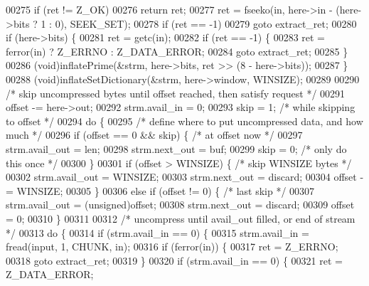 \begin{DoxyCode}
00275     \textcolor{keywordflow}{if} (ret != Z\_OK)
00276         \textcolor{keywordflow}{return} ret;
00277     ret = fseeko(in, here->in - (here->bits ? 1 : 0), SEEK\_SET);
00278     \textcolor{keywordflow}{if} (ret == -1)
00279         \textcolor{keywordflow}{goto} extract\_ret;
00280     \textcolor{keywordflow}{if} (here->bits) \{
00281         ret = getc(in);
00282         \textcolor{keywordflow}{if} (ret == -1) \{
00283             ret = ferror(in) ? Z\_ERRNO : Z\_DATA\_ERROR;
00284             \textcolor{keywordflow}{goto} extract\_ret;
00285         \}
00286         (void)inflatePrime(&strm, here->bits, ret >> (8 - here->bits));
00287     \}
00288     (void)inflateSetDictionary(&strm, here->window, WINSIZE);
00289 
00290     \textcolor{comment}{/* skip uncompressed bytes until offset reached, then satisfy request */}
00291     offset -= here->out;
00292     strm.avail\_in = 0;
00293     skip = 1;                               \textcolor{comment}{/* while skipping to offset */}
00294     \textcolor{keywordflow}{do} \{
00295         \textcolor{comment}{/* define where to put uncompressed data, and how much */}
00296         \textcolor{keywordflow}{if} (offset == 0 && skip) \{          \textcolor{comment}{/* at offset now */}
00297             strm.avail\_out = len;
00298             strm.next\_out = buf;
00299             skip = 0;                       \textcolor{comment}{/* only do this once */}
00300         \}
00301         \textcolor{keywordflow}{if} (offset > WINSIZE) \{             \textcolor{comment}{/* skip WINSIZE bytes */}
00302             strm.avail\_out = WINSIZE;
00303             strm.next\_out = discard;
00304             offset -= WINSIZE;
00305         \}
00306         \textcolor{keywordflow}{else} \textcolor{keywordflow}{if} (offset != 0) \{             \textcolor{comment}{/* last skip */}
00307             strm.avail\_out = (unsigned)offset;
00308             strm.next\_out = discard;
00309             offset = 0;
00310         \}
00311 
00312         \textcolor{comment}{/* uncompress until avail\_out filled, or end of stream */}
00313         \textcolor{keywordflow}{do} \{
00314             \textcolor{keywordflow}{if} (strm.avail\_in == 0) \{
00315                 strm.avail\_in = fread(input, 1, CHUNK, in);
00316                 \textcolor{keywordflow}{if} (ferror(in)) \{
00317                     ret = Z\_ERRNO;
00318                     \textcolor{keywordflow}{goto} extract\_ret;
00319                 \}
00320                 \textcolor{keywordflow}{if} (strm.avail\_in == 0) \{
00321                     ret = Z\_DATA\_ERROR;

\end{DoxyCode}
